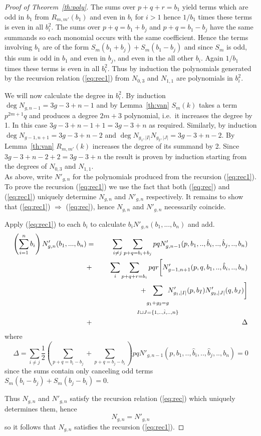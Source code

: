 \documentclass{amsart}
\newcommand{\ie}{i.e.\ }
\begin{document}
\begin{proof}[Proof of Theorem~\ref{th:poly}]
The sums over $p+q+r=b_1$ yield terms which are odd in $b_1$ from $R_{m,m'}(b_1)$ and even in $b_i$ for $i>1$ hence $1/b_1$ times these terms is even in all $b_i^2$.  The sums over $p+q=b_1+b_j$ and $p+q=b_1-b_j$ have the same summands so each monomial occurs with the same coefficient.  Hence the terms involving $b_1$ are of the form $S_m(b_1+b_j)+S_m(b_1-b_j)$ and since $S_m$ is odd, this sum is odd in $b_1$ and even in $b_j$, and even in the all other $b_i$.  Again $1/b_1$ times these terms is even in all $b_i^2$.  Thus by induction the polynomials generated by the recursion relation (\ref{eq:rec1}) from $N_{0,3}$ and $N_{1,1}$ are polynomials in $b_i^2$.

We will now calculate the degree in $b_i^2$.  By induction $\deg N_{g,n-1}=3g-3+n-1$ and by Lemma~\ref{th:van} $S_m(k)$ takes a term $p^{2m+1}q$ and produces a degree $2m+3$ polynomial, \ie it increases the degree by 1.  In this case $3g-3+n-1+1=3g-3+n$ as required.  Similarly, by induction $\deg N_{g-1,n+1}=3g-3+n-2$ and $\deg N_{g_1,|I|}N_{g_2,|J|}=3g-3+n-2$.  By Lemma~\ref{th:van} $R_{m,m'}(k)$ increases the degree of its summand by 2.  Since $3g-3+n-2+2=3g-3+n$ the result is proven by induction starting from the degrees of $N_{0,3}$ and $N_{1,1}$.\\

As above, write $N'_{g,n}$ for the polynomials produced from the recursion (\ref{eq:rec1}).  To prove the recursion (\ref{eq:rec1}) we use the fact that both (\ref{eq:rec}) and (\ref{eq:rec1}) uniquely determine $N_{g,n}$ and $N'_{g,n}$ respectively.  It remains to show that (\ref{eq:rec1}) $\Rightarrow$ (\ref{eq:rec}), hence $N_{g,n}$ and $N'_{g,n}$ necessarily coincide.

Apply (\ref{eq:rec1}) to each $b_i$ to calculate $b_iN'_{g,n}(b_1,...,b_n)$ and add.
{\setlength\arraycolsep{2pt} 
\begin{eqnarray*}
\left(\sum_{i=1}^nb_i\right)N'_{g,n}(b_1,...,b_n)&=&\sum_{i\neq j}\sum_{p+q=b_i+b_j}pqN'_{g,n-1}(p,b_1,..,\hat{b}_i,..,\hat{b}_j,..,b_n)\\
&+&\sum_i\sum_{p+q+r=b_i} pqr\biggl[N'_{g-1,n+1}(p,q,b_1,..,\hat{b}_i,..,b_n)\\
&&\hspace{20mm}+\hspace{-7mm}\sum_{\begin{array}{c}_{g_1+g_2=g}\\_{I\sqcup J=\{1,..,\hat{i},..,n\}}\end{array}}\hspace{-8mm}N'_{g_1,|I|}(p,b_I)N'_{g_2,|J|}(q,b_J)\biggr]\\
&+&\Delta
\end{eqnarray*}}
where
\[\Delta=\sum_{i\neq j}\frac{1}{2}\left(\sum_{p+q=b_i-b_j}+\sum_{p+q=b_j-b_i}\right)pqN'_{g,n-1}(p,b_1,..,\hat{b}_i,..,\hat{b}_j,..,b_n)=0\]
since the sums contain only canceling odd terms $S_m(b_i-b_j)+S_m(b_j-b_i)=0$.

Thus $N_{g,n}$ and $N'_{g,n}$ satisfy the recursion relation (\ref{eq:rec}) which uniquely determines them, hence 
\[ N_{g,n}=N'_{g,n}\]
so it follows that $N_{g,n}$ satisfies the recursion (\ref{eq:rec1}). 
\end{proof}
\end{document}
